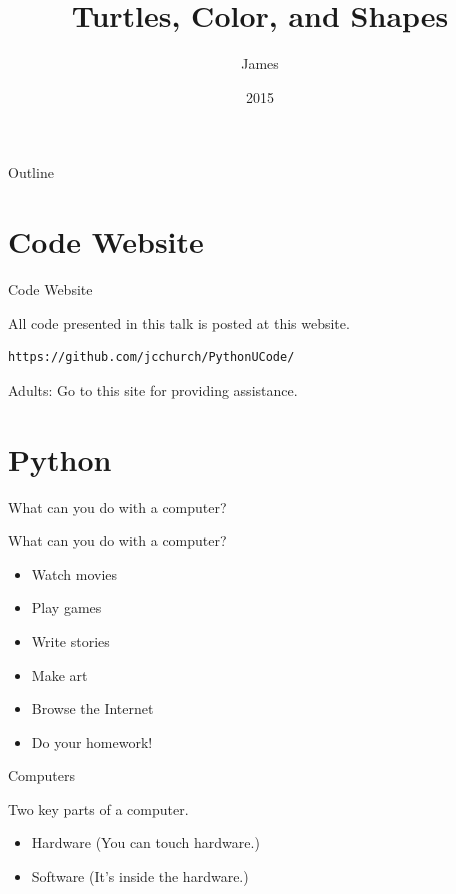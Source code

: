 \documentclass{beamer}
\title{Turtles, Color, and Shapes}
\subtitle{}
\author{James}
\institute{U. of West Georgia} \date{2015}
\begin{document}
\begin{frame}
  \titlepage
\end{frame}

\begin{frame}{Outline}
  \tableofcontents
\end{frame}

\section{Code Website}

\begin{frame}[fragile]{Code Website}

All code presented in this talk is posted at this website.

\begin{verbatim}
https://github.com/jcchurch/PythonUCode/
\end{verbatim}

Adults: Go to this site for providing assistance.

\end{frame}

\section{Python}

\begin{frame}{What can you do with a computer?}

What can you do with a computer?

\pause

\begin{itemize}
\item Watch movies
\item Play games
\item Write stories
\item Make art
\item Browse the Internet
\pause
\item Do your homework!
\end{itemize}
\end{frame}

\begin{frame}{Computers}

Two key parts of a computer.

\begin{itemize}
\item Hardware (You can touch hardware.)
\item Software (It's inside the hardware.)
\end{itemize}
\end{frame}
\end{document}
